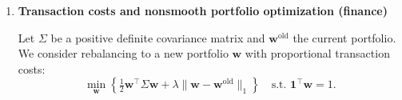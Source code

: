 \documentclass[11pt]{article}
\begin{document}
\begin{enumerate}
\begin{enumerate}
\begin{itemize}
\item the $\bm{w}$–step involves:
\begin{itemize}
\item a \textbf{quadratic} function
\item plus a \textbf{linear constraint} $\bm{1}^\top \bm{w}=1$,
\end{itemize}
\item the $\bm{z}$–step involves:
\begin{itemize}
\item only the $\ell_1$ norm
\item which has a simple proximal operator (soft-thresholding),
\end{itemize}
\item the algorithm alternates between:
\begin{itemize}
\item solving a quadratic program,
\item applying a coordinatewise soft-thresholding.
\end{itemize}
\end{itemize}

Explain why this splitting makes the algorithm:
\begin{itemize}
\item numerically efficient,
\item naturally parallelizable,
\item able to handle large $n$ portfolios.
\end{itemize}

\end{enumerate}

\bigskip

\item \textbf{Transaction costs and nonsmooth portfolio optimization (finance)}

Let $\Sigma$ be a positive definite covariance matrix and $\bm{w}^{\mathrm{old}}$ the current portfolio.
We consider rebalancing to a new portfolio $\bm{w}$ with proportional transaction costs:
\[
\min_{\bm{w}} 
\left\{
\tfrac{1}{2}\bm{w}^\top \Sigma \bm{w}
+ \lambda \|\bm{w}-\bm{w}^{\mathrm{old}}\|_1
\right\}
\quad \text{s.t. } \bm{1}^\top \bm{w}=1.
\]


\end{enumerate}
\end{document}
